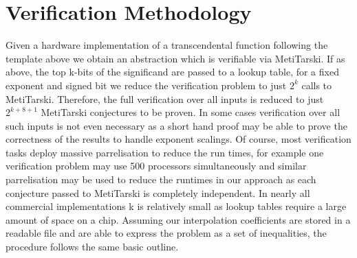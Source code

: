 \documentclass[a4]{article}
\begin{document}
\section{Verification Methodology}
Given a hardware implementation of a transcendental function following the template above we obtain an abstraction which is verifiable via MetiTarski. If as above, the top k-bits of the significand are passed to a lookup table, for a fixed exponent and signed bit we reduce the verification problem to just $2^k$ calls to MetiTarski. Therefore, the  full verification over all inputs is reduced to 
just $2^{k+8+1}$ MetiTarski conjectures to be proven. In some cases verification over all such inputs is not even necessary as a short hand proof may be able to prove the correctness of the results to handle exponent scalings. Of course, most verification tasks deploy massive parrelisation to reduce the run times, for example one verification problem may use 500 processors simultaneously and similar parrelisation may be used to reduce the runtimes in our approach as each conjecture passed to MetiTarski is completely independent. In nearly all commercial implementations k is relatively small as lookup tables require a large amount of space on a chip. Assuming our interpolation coefficients are stored in a readable file and are able to express the problem as a set of inequalities, the procedure follows the same basic outline.


\vspace{0.2cm}
\noindent{}
\vspace{0.2cm}
\end{document}
